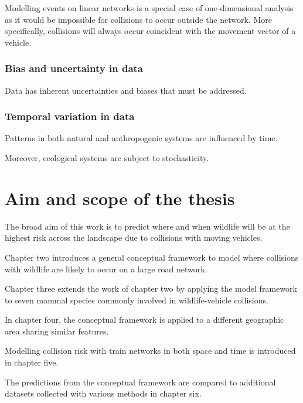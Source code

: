 Modelling events on linear networks is a special case of one-dimensional analysis as it would be impossible for collisions to occur outside the network.  More specifically, collisions will always occur coincident with the movement vector of a vehicle.

\subsubsection{Bias and uncertainty in data}

Data has inherent uncertainties and biases that must be addressed.

\subsubsection{Temporal variation in data}

Patterns in both natural and anthropogenic systems are influenced by time.

Moreover, ecological systems are subject to stochasticity.

%

\section{Aim and scope of the thesis}

The broad aim of this work is to predict where and when wildlife will be at the highest risk across the landscape due to collisions with moving vehicles.

Chapter two introduces a general conceptual framework to model where collisions with wildlife are likely to occur on a large road network.

Chapter three extends the work of chapter two by applying the model framework to seven mammal species commonly involved in wildlife-vehicle collisions.

In chapter four, the conceptual framework is applied to a different geographic area sharing similar features.

Modelling collision risk with train networks in both space and time is introduced in chapter five.

The predictions from the conceptual framework are compared to additional datasets collected with various methods in chapter six.